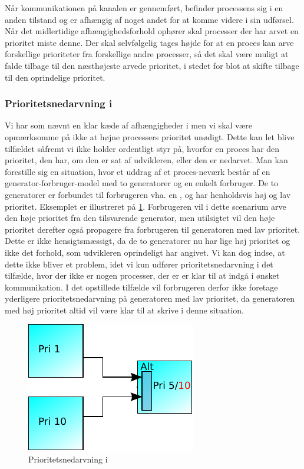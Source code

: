 Når kommunikationen på kanalen er gennemført, befinder processens sig i en anden tilstand og er afhængig af noget andet for at komme videre i sin udførsel. 
Når det midlertidige afhængighedsforhold ophører skal processer der har arvet en prioritet miste denne. Der skal selvfølgelig tages højde for at en proces kan arve forskellige prioriteter fra forskellige andre processer, så det skal være muligt at falde tilbage til den næsthøjeste arvede prioritet, i stedet for blot at skifte tilbage til den oprindelige prioritet. 

\subsubsection*{Prioritetsnedarvning i }
Vi har som nævnt en klar kæde af afhængigheder i \pycsp men vi skal være opmærksomme på ikke at højne processers prioritet unødigt. Dette kan let blive tilfældet såfremt vi ikke holder ordentligt styr på, hvorfor en proces har den prioritet, den har, om den er sat af udvikleren, eller den er nedarvet. Man kan forestille sig en situation, hvor et uddrag af et proces-neværk består af en generator-forbruger-model med to generatorer og en enkelt forbruger. De to generatorer er forbundet til forbrugeren vha. en , og har henholdsvis høj og lav prioritet. Eksemplet er illustreret på \cref{fig:alt-inheritance}. Forbrugeren vil i dette scenarium arve den høje prioritet fra den tilsvarende generator, men utilsigtet vil den høje prioritet derefter også propagere fra forbrugeren til generatoren med lav prioritet. Dette er ikke hensigtsmæssigt, da de to generatorer nu har lige høj prioritet og ikke det forhold, som udvikleren oprindeligt har angivet. Vi kan dog indse, at dette ikke bliver et problem, idet vi kun udfører prioritetsnedarvning i det tilfælde, hvor der ikke er nogen processer, der er er klar til at indgå i ønsket kommunikation. I det opstillede tilfælde vil forbrugeren derfor ikke foretage yderligere prioritetsnedarvning på generatoren med lav prioritet, da generatoren med høj prioritet altid vil være klar til at skrive i denne situation. 

\begin{figure}
 \begin{center}
  \includegraphics[scale=1.00]{images/alt-inheritance}
  \caption{Prioritetsnedarvning i }
  \label{fig:alt-inheritance}
  \end{center}
\end{figure}

